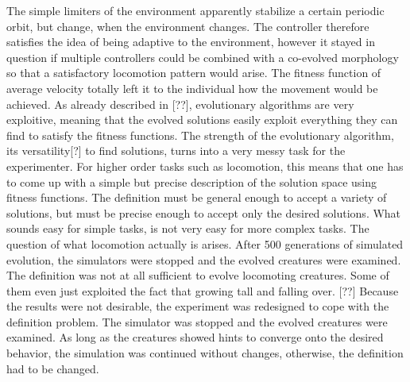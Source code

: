 \documentclass[main]{subfiles}
\begin{document}

The simple limiters of the environment apparently stabilize a certain periodic orbit, but change, when the environment changes. The controller therefore satisfies the idea of being adaptive to the environment, however it stayed in question if multiple controllers could be combined with a co-evolved morphology so that a satisfactory locomotion pattern would arise. The fitness function of average velocity totally left it to the individual how the movement would be achieved. As already described in [??], evolutionary algorithms are very exploitive, meaning that the evolved solutions easily exploit everything they can find to satisfy the fitness functions. The strength of the evolutionary algorithm, its versatility[?] to find solutions, turns into a very messy task for the experimenter. For higher order tasks such as locomotion, this means that one has to come up with a simple but precise description of the solution space using fitness functions. The definition must be general enough to accept a variety of solutions, but must be precise enough to accept only the desired solutions. What sounds easy for simple tasks, is not very easy for more complex tasks. The question of what locomotion actually is arises. After 500 generations of simulated evolution, the simulators were stopped and the evolved creatures were examined. The definition was not at all sufficient to evolve locomoting creatures. Some of them even just exploited the fact that growing tall and falling over. [??] Because the results were not desirable, the experiment was redesigned to cope with the definition problem. The simulator was stopped and the evolved creatures were examined. As long as the creatures showed hints to converge onto the desired behavior, the simulation was continued without changes, otherwise, the definition had to be changed. 
\end{document}
